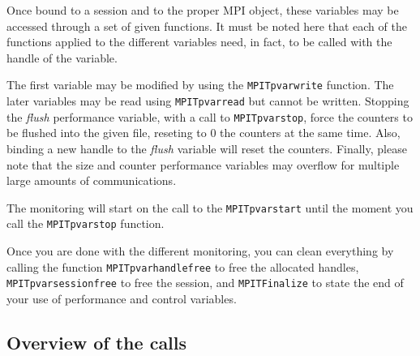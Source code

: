 Once bound to a session and to the proper MPI object, these variables
may be accessed through a set of given functions. It must be noted
here that each of the functions applied to the different variables
need, in fact, to be called with the handle of the variable.

The first variable may be modified by using the
\texttt{MPI\brkunds{}T\brkunds{}pvar\brkunds{}write} function. The
later variables may be read using
\texttt{MPI\brkunds{}T\brkunds{}pvar\brkunds{}read} but cannot be
written. Stopping the \textit{flush} performance variable, with a call
to \texttt{MPI\brkunds{}T\brkunds{}pvar\brkunds{}stop}, force the
counters to be flushed into the given file, reseting to 0 the counters
at the same time. Also, binding a new handle to the \textit{flush}
variable will reset the counters. Finally, please note that the size
and counter performance variables may overflow for multiple large
amounts of communications.

The monitoring will start on the call to the
\texttt{MPI\brkunds{}T\brkunds{}pvar\brkunds{}start} until the moment
you call the \texttt{MPI\brkunds{}T\brkunds{}pvar\brkunds{}stop}
function.

Once you are done with the different monitoring, you can clean
everything by calling the function
\texttt{MPI\brkunds{}T\brkunds{}pvar\brkunds{}handle\brkunds{}free} to
free the allocated handles,
\texttt{MPI\brkunds{}T\brkunds{}pvar\brkunds{}session\brkunds{}free}
to free the session, and \texttt{MPI\brkunds{}T\brkunds{}Finalize} to
state the end of your use of performance and control variables.

\subsection{Overview of the calls}

